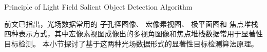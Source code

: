 


%
%
%
%
%
%
%
%
%
%
%
%
%
%
%
%
%
%










{Principle of Light Field Salient Object Detection Algorithm}

%
%
%
%
%
%
前文已指出，光场数据常用的
子孔径图像、
宏像素视图、
极平面图和
焦点堆栈
四种表示方式，其中宏像素视图成像出的多视角图像和焦点堆栈数据常用于显著性目标检测。
本小节探讨了基于这两种光场数据形式的显著性目标检测算法原理。



%
%






